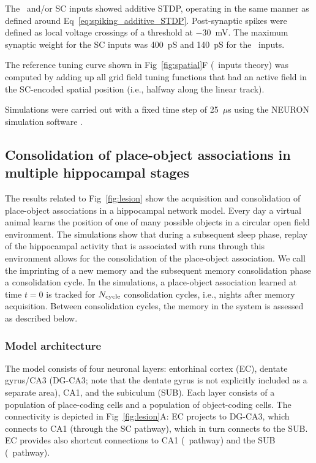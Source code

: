The \ppca~and/or SC inputs showed additive STDP, operating in the same manner as defined around Eq~\eqref{eq:spiking_additive_STDP}. Post-synaptic spikes were defined as local voltage crossings of a threshold at $-30$~mV. The maximum synaptic weight for the SC inputs was 400~pS and 140~pS for the \ppca~inputs.

The reference tuning curve shown in Fig~\ref{fig:spatial}F (\ppca~inputs theory) was computed by adding up all grid field tuning functions that had an active field in the SC-encoded spatial position (i.e., halfway along the linear track).

Simulations were carried out with a fixed time step of 25~$\mu$s using the NEURON simulation software \cite{Hines1997}.

\subsection{Consolidation of place-object associations in multiple hippocampal stages}%
\label{ssec:ppt_methods_lesion}
The results related to Fig~\ref{fig:lesion} show the acquisition and consolidation of place-object associations in a hippocampal network model. Every day a virtual animal learns the position of one of many possible objects in a circular open field environment. The simulations show that during a subsequent sleep phase, replay of the hippocampal activity that is associated with runs through this environment allows for the consolidation of the place-object association. We call the imprinting of a new memory and the subsequent memory consolidation phase a consolidation cycle. In the simulations, a place-object association learned at time $t=0$ is tracked for $N_{\rm cycle}$ consolidation cycles, i.e., nights after memory acquisition. Between consolidation cycles, the memory in the system is assessed as described below.

\subsubsection{Model architecture}
The model consists of four neuronal layers: entorhinal cortex (EC), dentate gyrus/CA3 (DG-CA3; note that the dentate gyrus is not explicitly included as a separate area), CA1, and the subiculum (SUB). Each layer consists of a population of place-coding cells and a population of object-coding cells. The connectivity is depicted in Fig~\ref{fig:lesion}A: EC projects to DG-CA3, which connects to CA1 (through the SC pathway), which in turn connects to the SUB. EC provides also shortcut connections to CA1 (\ppca~pathway) and the SUB (\ppsub~pathway).

